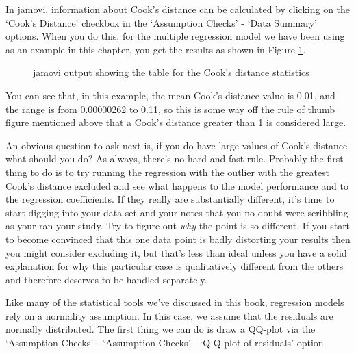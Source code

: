 In jamovi, information about Cook's distance can be calculated by clicking on the `Cook's Distance' checkbox in the `Assumption Checks' - `Data Summary' options. When you do this, for the multiple regression model we have been using as an example in this chapter, you get the results as shown in Figure \ref{fig:reg4}. 

\begin{figure}[!htb]
\begin{center}
\caption{jamovi output showing the table for the Cook's distance statistics}
\HR
\label{fig:reg4}
\end{center}
\end{figure}

You can see that, in this example, the mean Cook's distance value is 0.01, and the range is from 0.00000262 to 0.11, so this is some way off the rule of thumb figure mentioned above that a Cook's distance greater than 1 is considered large. 

An obvious question to ask next is, if you do have large values of Cook's distance what should you do? As always, there's no hard and fast rule. Probably the first thing to do is to try running the regression with the outlier with the greatest Cook's distance excluded and see what happens to the model performance and to the regression coefficients. If they really are substantially different, it's time to start digging into your data set and your notes that you no doubt were scribbling as your ran your study. Try to figure out {\it why} the point is so different. If you start to become convinced that this one data point is badly distorting your results then you might consider excluding it, but that's less than ideal unless you have a solid explanation for why this particular case is qualitatively different from the others and therefore deserves to be handled separately.


Like many of the statistical tools we've discussed in this book, regression models rely on a normality assumption. In this case, we assume that the residuals are normally distributed. The first thing we can do is draw a QQ-plot via the `Assumption Checks' - `Assumption Checks' - `Q-Q plot of residuals' option. 


